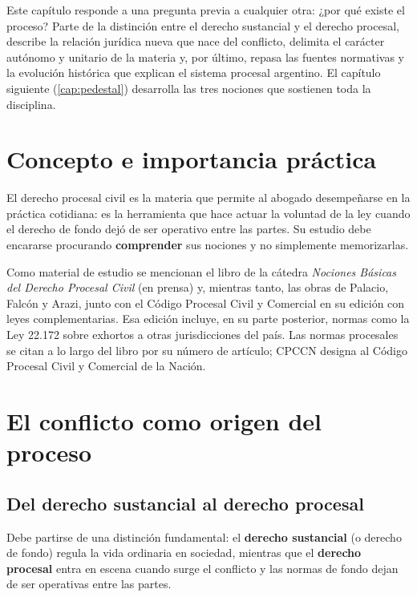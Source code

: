 \documentclass[12pt,oneside]{book}
\begin{document}
Este capítulo responde a una pregunta previa a cualquier otra: ¿por qué existe el proceso? Parte de la distinción entre el derecho sustancial y el derecho procesal, describe la relación jurídica nueva que nace del conflicto, delimita el carácter autónomo y unitario de la materia y, por último, repasa las fuentes normativas y la evolución histórica que explican el sistema procesal argentino. El capítulo siguiente (\ref{cap:pedestal}) desarrolla las tres nociones que sostienen toda la disciplina.

\section{Concepto e importancia práctica}

El derecho procesal civil es la materia que permite al abogado desempeñarse en la práctica cotidiana: es la herramienta que hace actuar la voluntad de la ley cuando el derecho de fondo dejó de ser operativo entre las partes. Su estudio debe encararse procurando \textbf{comprender} sus nociones y no simplemente memorizarlas.

\begin{nota}
Como material de estudio se mencionan el libro de la cátedra \textit{Nociones Básicas del Derecho Procesal Civil} (en prensa) y, mientras tanto, las obras de Palacio, Falcón y Arazi, junto con el Código Procesal Civil y Comercial en su edición con leyes complementarias. Esa edición incluye, en su parte posterior, normas como la Ley 22.172 sobre exhortos a otras jurisdicciones del país. Las normas procesales se citan a lo largo del libro por su número de artículo; CPCCN designa al Código Procesal Civil y Comercial de la Nación.
\end{nota}

\section{El conflicto como origen del proceso}

\subsection{Del derecho sustancial al derecho procesal}

Debe partirse de una distinción fundamental: el \textbf{derecho sustancial} (o derecho de fondo) regula la vida ordinaria en sociedad, mientras que el \textbf{derecho procesal} entra en escena cuando surge el conflicto y las normas de fondo dejan de ser operativas entre las partes.
\end{document}
